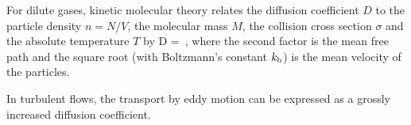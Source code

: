 For dilute gases, kinetic molecular theory relates the diffusion coefficient $D$ to the particle density $n = N/V$, the molecular mass $M$, the collision cross section $\sigma$ and the absolute temperature $T$ by
\beq
D = \,,
\eeq
where the second factor is the mean free path and the square root (with Boltzmann's constant $k_\text{b}$) is the mean velocity of the particles.

In turbulent flows, the transport by eddy motion can be expressed as a grossly increased diffusion coefficient.
